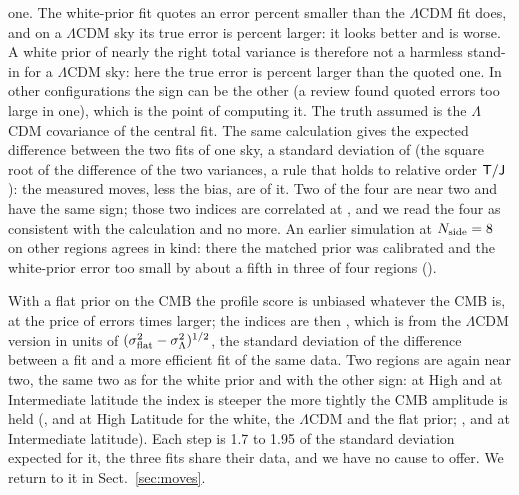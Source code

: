 one. The white-prior fit quotes an error  percent smaller than the
$\Lambda$CDM fit does, and on a $\Lambda$CDM sky its true error is  percent
larger: it looks better and is worse. A white prior of nearly the right total variance is therefore not a harmless stand-in for a
$\Lambda$CDM sky: here the true error is  percent larger than the quoted one. In
other configurations the sign can be the other (a review found quoted errors too large in one),
which is the point of computing it. The truth assumed is the $\Lambda$CDM covariance of the central
fit. The same calculation gives the expected
difference between the two fits of one sky, a standard deviation of  (the square
root of the difference of the two variances, a rule that holds to relative order $\mathsf{T}/\mathsf{J}$): the
measured moves, less the bias, are  of it. Two of the four are near two and have
the same sign; those two indices are correlated at , and we read the four as
consistent with the calculation and no more. An earlier simulation at $N_{\rm side}=8$ on other regions
agrees in kind: there the matched prior was calibrated and the white-prior error too small by about a
fifth in three of four regions ().

With a flat prior on the CMB the profile score is unbiased whatever the CMB is, at the price of errors
 times larger; the indices are then , which is
 from the $\Lambda$CDM version in units of
$(\sigma_{\rm flat}^2 - \sigma_{\Lambda}^2)^{1/2}$, the standard deviation of the difference between a
fit and a more efficient fit of the same data. Two regions are again near two, the same two as for
the white prior and with the other sign: at High and at Intermediate latitude the index is steeper
the more tightly the CMB amplitude is held (,  and  at High
Latitude for the white, the $\Lambda$CDM and the flat prior; ,  and
 at Intermediate latitude). Each step is 1.7 to 1.95 of the standard deviation
expected for it, the three fits share their data, and we have no cause to offer. We return to it in
Sect.~\ref{sec:moves}.

